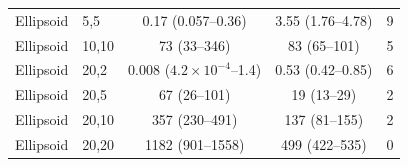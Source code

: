 \documentclass[11pt]{article}
\begin{document}
\begin{table}[H]
\begin{tabular}{llccc}
Ellipsoid & 5,5 &
0.17 (0.057--0.36) &
3.55 (1.76--4.78) & 9 \\

Ellipsoid & 10,10 &
73 (33--346) &
83 (65--101) & 5 \\

Ellipsoid & 20,2 &
0.008 ($4.2\times10^{-4}$--1.4) &
0.53 (0.42--0.85) & 6 \\

Ellipsoid & 20,5 &
67 (26--101) &
19 (13--29) & 2 \\

Ellipsoid & 20,10 &
357 (230--491) &
137 (81--155) & 2 \\

Ellipsoid & 20,20 &
1182 (901--1558) &
499 (422--535) & 0 \\

\bottomrule
\end{tabular}
\end{table}


%
%
\clearpage
\nocite{*}


\end{document}

